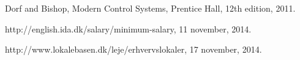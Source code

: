\begin{thebibliography}{9}
	Dorf and Bishop,
	Modern Control Systems,
	Prentice Hall, 
	12th edition, 
	2011.

	http://english.ida.dk/salary/minimum-salary,
	11 november,
	2014.
	
	http://www.lokalebasen.dk/leje/erhvervslokaler,
	17 november,
	2014.
	
	
\end{thebibliography}
